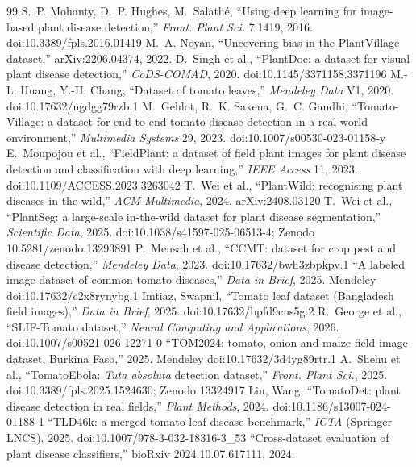 \begin{thebibliography}{99}
\footnotesize
{} S.~P. Mohanty, D.~P. Hughes, M.~Salath\'e, ``Using deep learning for image-based plant disease detection,'' \emph{Front. Plant Sci.} 7:1419, 2016. doi:10.3389/fpls.2016.01419
 M.~A. Noyan, ``Uncovering bias in the PlantVillage dataset,'' arXiv:2206.04374, 2022.
 D.~Singh et al., ``PlantDoc: a dataset for visual plant disease detection,'' \emph{CoDS-COMAD}, 2020. doi:10.1145/3371158.3371196
 M.-L. Huang, Y.-H. Chang, ``Dataset of tomato leaves,'' \emph{Mendeley Data} V1, 2020. doi:10.17632/ngdgg79rzb.1
 M.~Gehlot, R.~K. Saxena, G.~C. Gandhi, ``Tomato-Village: a dataset for end-to-end tomato disease detection in a real-world environment,'' \emph{Multimedia Systems} 29, 2023. doi:10.1007/s00530-023-01158-y
 E.~Moupojou et al., ``FieldPlant: a dataset of field plant images for plant disease detection and classification with deep learning,'' \emph{IEEE Access} 11, 2023. doi:10.1109/ACCESS.2023.3263042
 T.~Wei et al., ``PlantWild: recognising plant diseases in the wild,'' \emph{ACM Multimedia}, 2024. arXiv:2408.03120
 T.~Wei et al., ``PlantSeg: a large-scale in-the-wild dataset for plant disease segmentation,'' \emph{Scientific Data}, 2025. doi:10.1038/s41597-025-06513-4; Zenodo 10.5281/zenodo.13293891
 P.~Mensah et al., ``CCMT: dataset for crop pest and disease detection,'' \emph{Mendeley Data}, 2023. doi:10.17632/bwh3zbpkpv.1
 ``A labeled image dataset of common tomato diseases,'' \emph{Data in Brief}, 2025. Mendeley doi:10.17632/c2x8rynybg.1
 Imtiaz, Swapnil, ``Tomato leaf dataset (Bangladesh field images),'' \emph{Data in Brief}, 2025. doi:10.17632/bpfd9cns5g.2
 R.~George et al., ``SLIF-Tomato dataset,'' \emph{Neural Computing and Applications}, 2026. doi:10.1007/s00521-026-12271-0
 ``TOM2024: tomato, onion and maize field image dataset, Burkina Faso,'' 2025. Mendeley doi:10.17632/3d4yg89rtr.1
 A.~Shehu et al., ``TomatoEbola: \emph{Tuta absoluta} detection dataset,'' \emph{Front. Plant Sci.}, 2025. doi:10.3389/fpls.2025.1524630; Zenodo 13324917
 Liu, Wang, ``TomatoDet: plant disease detection in real fields,'' \emph{Plant Methods}, 2024. doi:10.1186/s13007-024-01188-1
 ``TLD46k: a merged tomato leaf disease benchmark,'' \emph{ICTA} (Springer LNCS), 2025. doi:10.1007/978-3-032-18316-3\_53
 ``Cross-dataset evaluation of plant disease classifiers,'' bioRxiv 2024.10.07.617111, 2024.


\end{thebibliography}
